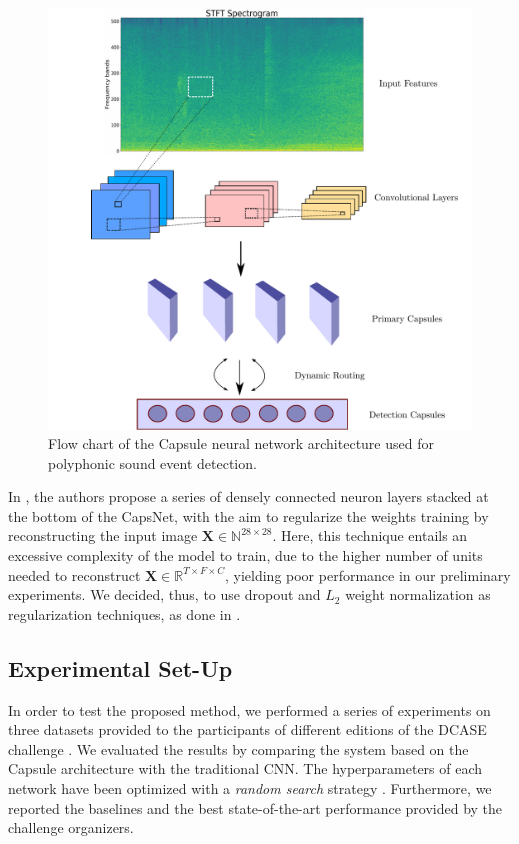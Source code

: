 \begin{figure}[htbp]
	\centering
	\includegraphics[width=\columnwidth]{img/flow_chart_2}
	\caption[Polyphonic SED with CapsNets]{Flow chart of the Capsule neural network architecture used for polyphonic sound event detection.}
	\label{fig:flowchart_capsulesed}
\end{figure}

In \cite{sabour2017dynamic}, the authors propose a series of densely connected neuron layers stacked at the bottom of the CapsNet, with the aim to regularize the weights training by reconstructing the input image $\mathbf{X} \in \mathbb{N}^{28 \times 28}$. Here, this technique entails an excessive complexity of the model to train, due to the higher number of units needed to reconstruct $\mathbf{X} \in \mathbb{R}^{T \times F \times C}$, yielding poor performance in our preliminary experiments. We decided, thus, to use dropout \cite{srivastava2014dropout} and $L_2$ weight normalization \cite{hoerl1970ridge} as regularization techniques, as done in \cite{iqbal2018capsule}.

\subsection{Experimental Set-Up}


In order to test the proposed method, we performed a series of experiments on three datasets provided to the participants of different editions of the DCASE challenge \cite{DCASE2017challenge, mesaros2016tut}. We evaluated the results by comparing the system based on the Capsule architecture with the traditional CNN. The hyperparameters of each network have been optimized with a \textit{random search} strategy \cite{bergstra2012random}. Furthermore, we reported the baselines and the best state-of-the-art performance provided by the challenge organizers.

